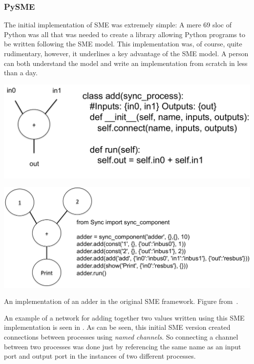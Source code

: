 \subsubsection{ PySME}
The initial implementation of SME was extremely simple: A mere 69 \gls{sloc} of
Python was all that was needed to create a library allowing Python programs to
be written following the SME model. This implementation was, of course, quite
rudimentary, however, it underlines a key advantage of the SME model. A person
can both understand the model and write an implementation from scratch in less
than a day.

\begin{widefigure}
  \centering
  \begin{minipage}{0.49\textwidth}
    \centering
    \includegraphics[width=.9\textwidth]{figures/add}
  \end{minipage}
  \begin{minipage}{0.49\textwidth}
    \centering
    \includegraphics[width=\textwidth]{figures/addnet}
  \end{minipage}
  \caption{An implementation of an adder in the original SME framework. Figure
    from~\cite{vinter2014synchronous}.}
  \label{fig:adder}
\end{widefigure}

An example of a network for adding together two values written using this SME
implementation is seen in . As can be seen, this initial SME
version created connections between processes using {\itshape named
  channels}. So connecting a channel between two processes was done just by
referencing the same name as an input port and output port in the instances of
two different processes.


